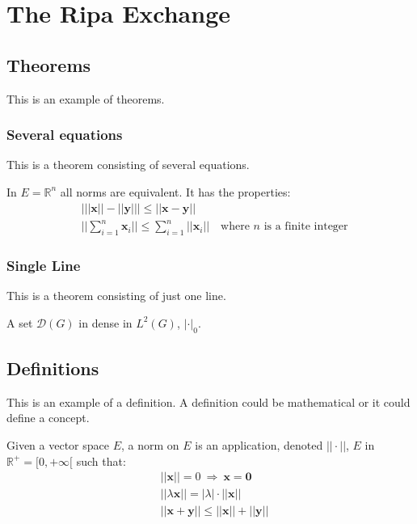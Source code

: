 \documentclass[11pt,fleqn,oneside]{book} %
\begin{document}
\chapter{The Ripa Exchange}

\section{Theorems}

This is an example of theorems.

\subsection{Several equations}
This is a theorem consisting of several equations.

\begin{theorem}
	In $E=\mathbb{R}^n$ all norms are equivalent. It has the properties:
	\begin{align}
		 & \big| ||\mathbf{x}|| - ||\mathbf{y}|| \big|\leq || \mathbf{x}- \mathbf{y}||                            \\
		 & ||\sum_{i=1}^n\mathbf{x}_i||\leq \sum_{i=1}^n||\mathbf{x}_i||\quad\text{where $n$ is a finite integer}
	\end{align}
\end{theorem}

\subsection{Single Line}
This is a theorem consisting of just one line.

\begin{theorem}
	A set $\mathcal{D}(G)$ in dense in $L^2(G)$, $|\cdot|_0$.
\end{theorem}


\section{Definitions}

This is an example of a definition. A definition could be mathematical or it could define a concept.

\begin{definition}
	Given a vector space $E$, a norm on $E$ is an application, denoted $||\cdot||$, $E$ in $\mathbb{R}^+=[0,+\infty[$ such that:
	\begin{align}
		 & ||\mathbf{x}||=0\ \Rightarrow\ \mathbf{x}=\mathbf{0}        \\
		 & ||\lambda \mathbf{x}||=|\lambda|\cdot ||\mathbf{x}||        \\
		 & ||\mathbf{x}+\mathbf{y}||\leq ||\mathbf{x}||+||\mathbf{y}||
	\end{align}
\end{definition}
\end{document}
